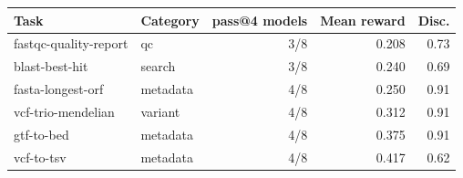\begin{tabular}{llrrr}
\toprule
Task & Category & pass@4 models & Mean reward & Disc. \\
\midrule
fastqc-quality-report & qc & 3/8 & 0.208 & 0.73 \\
blast-best-hit & search & 3/8 & 0.240 & 0.69 \\
fasta-longest-orf & metadata & 4/8 & 0.250 & 0.91 \\
vcf-trio-mendelian & variant & 4/8 & 0.312 & 0.91 \\
gtf-to-bed & metadata & 4/8 & 0.375 & 0.91 \\
vcf-to-tsv & metadata & 4/8 & 0.417 & 0.62 \\
\bottomrule
\end{tabular}

